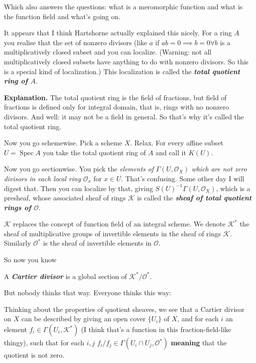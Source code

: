 Which also answers the questions: what is a meromorphic function and what is the function field and what's going on.

It appears that I think Hartshorne actually explained this nicely. For a ring \(A\) you realise that the set of nonzero divisors (like \(a\) if \(ab=0 \implies b=0\forall b\) is a multiplicatively closed subset and you can localize. (Warning: not all multiplicatively closed subsets have anything to do with nonzero divisors. So this is a special kind of localization.) This localization is called the  \textit{\textbf{total quotient ring of \(A\)}}.

\textbf{Explanation.} The total quotient ring is the field of fractions, but field of fractions is defined only for integral domain, that is, rings with no nonzero divisors. And well: it may not be a field in general. So that's why it's called the total quotient ring.

Now you go schemewise. Pick a scheme \(X\). Relax. For every affine subset \(U=\operatorname{Spec}A\) you take the total quotient ring of \(A\) and call it \(K(U)\).

Now you go sectionwise. You pick the \textit{elements of \(\Gamma(U,\mathcal{O}_X)\) which are not zero divisors in each local ring \(\mathcal{O}_x\)} for \(x \in U\). That's confusing. Some other day I will digest that. Then you can localize by that, giving \(S(U)^{-1}\Gamma(U,\mathcal{O}_X)\), which is a presheaf, whose associated sheaf of rings \(\mathcal{K}\) is called the \textit{\textbf{sheaf of total quotient rings of \(\mathcal{O}\)}}.

\(\mathcal{K}\) replaces the concept of function field of an integral scheme. We denote \(\mathcal{K}^*\) the sheaf of multiplicative groups of invertible elements in the sheaf of rings \(\mathcal{K}\). Similarly \(\mathcal{O}^*\) is the sheaf of invertible elements in \(\mathcal{O}\).

So now you know
\begin{tcolorbox}[colback=white,colframe=black,boxrule=0.5pt,sharp corners]
A \textit{\textbf{Cartier divisor}} is a global section of \(\mathcal{K}^*/\mathcal{O}^*\).
\end{tcolorbox}
But nobody thinks that way. Everyone thinks this way:
\begin{tcolorbox}[colback=white,colframe=black,boxrule=0.5pt,sharp corners]
Thinking about the properties of quotient sheaves, we see that a Cartier divisor on \(X\) can be described by giving an open cover \(\{U_i\}\) of \(X\), and for each \(i\) an element \(f_i \in \Gamma(U_i,\mathcal{K}^*)\) (I think that's a function in this fraction-field-like thingy), such that for each \(i,j\) \(f_i/f_j \in \Gamma(U_i\cap U_j, \mathcal{O}^*)\) \textbf{meaning} that the quotient is not zero.
\end{tcolorbox}

